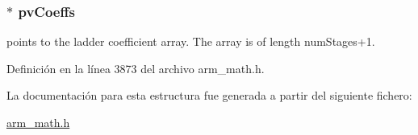 \subsubsection[{\texorpdfstring{pv\+Coeffs}{pvCoeffs}}]{$\ast$ pv\+Coeffs}\hypertarget{structarm__iir__lattice__instance__q31_a3d7de56fe9de3458f033a64f14407533}{}\label{structarm__iir__lattice__instance__q31_a3d7de56fe9de3458f033a64f14407533}
points to the ladder coefficient array. The array is of length num\+Stages+1. 

Definición en la línea 3873 del archivo arm\+\_\+math.\+h.



La documentación para esta estructura fue generada a partir del siguiente fichero\+:\begin{DoxyCompactItemize}
\item 
\hyperlink{arm__math_8h}{arm\+\_\+math.\+h}\end{DoxyCompactItemize}
